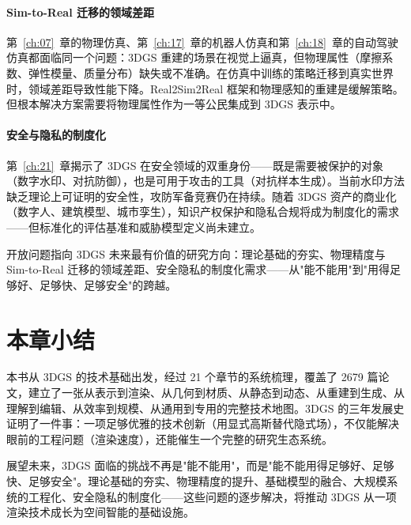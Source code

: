 \paragraph{Sim-to-Real 迁移的领域差距}
第~\ref{ch:07}~章的物理仿真、第~\ref{ch:17}~章的机器人仿真和第~\ref{ch:18}~章的自动驾驶仿真都面临同一个问题：3DGS 重建的场景在视觉上逼真，但物理属性（摩擦系数、弹性模量、质量分布）缺失或不准确。在仿真中训练的策略迁移到真实世界时，领域差距导致性能下降。Real2Sim2Real 框架和物理感知的重建是缓解策略。但根本解决方案需要将物理属性作为一等公民集成到 3DGS 表示中。

\paragraph{安全与隐私的制度化}
第~\ref{ch:21}~章揭示了 3DGS 在安全领域的双重身份——既是需要被保护的对象（数字水印、对抗防御），也是可用于攻击的工具（对抗样本生成）。当前水印方法缺乏理论上可证明的安全性，攻防军备竞赛仍在持续。随着 3DGS 资产的商业化（数字人、建筑模型、城市孪生），知识产权保护和隐私合规将成为制度化的需求——但标准化的评估基准和威胁模型定义尚未建立。

\begin{takeaway}
开放问题指向 3DGS 未来最有价值的研究方向：理论基础的夯实、物理精度与 Sim-to-Real 迁移的领域差距、安全隐私的制度化需求——从"能不能用"到"用得足够好、足够快、足够安全"的跨越。
\end{takeaway}

\section*{本章小结}

本书从 3DGS 的技术基础出发，经过 21 个章节的系统梳理，覆盖了 2679 篇论文，建立了一张从表示到渲染、从几何到材质、从静态到动态、从重建到生成、从理解到编辑、从效率到规模、从通用到专用的完整技术地图。3DGS 的三年发展史证明了一件事：一项足够优雅的技术创新（用显式高斯替代隐式场），不仅能解决眼前的工程问题（渲染速度），还能催生一个完整的研究生态系统。

展望未来，3DGS 面临的挑战不再是"能不能用"，而是"能不能用得足够好、足够快、足够安全"。理论基础的夯实、物理精度的提升、基础模型的融合、大规模系统的工程化、安全隐私的制度化——这些问题的逐步解决，将推动 3DGS 从一项渲染技术成长为空间智能的基础设施。

